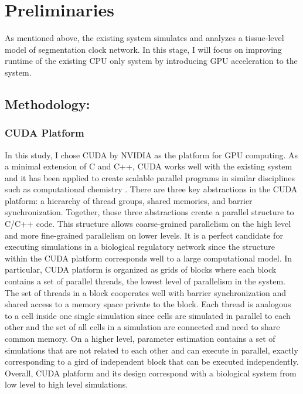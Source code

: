 \documentclass[../thesis.tex]{subfiles}
\begin{document}
\chapter{Preliminaries}
\label{ch:prelim}
As mentioned above, the existing system simulates and analyzes a tissue-level model of segmentation clock network. In this stage, I will focus on improving runtime of the existing CPU only system by introducing GPU acceleration to the system. 
\section{Methodology: }
\subsection{CUDA Platform}
In this study, I chose CUDA by NVIDIA as the platform for GPU computing. As a minimal extension of C and C++, CUDA works well with the existing system and it has been applied to create scalable parallel programs in similar disciplines such as computational chemistry \cite{nickolls2008scalable}. There are three key abstractions in the CUDA platform: a hierarchy of thread groups, shared memories, and barrier synchronization. Together, those three abstractions create a parallel structure to C/C++ code. This structure allows coarse-grained parallelism on the high level and more fine-grained parallelism on lower levels. It is a perfect candidate for executing simulations in a biological regulatory network since the structure within the CUDA platform corresponds well to a large computational model. In particular, CUDA platform is organized as grids of blocks where each block contains a set of parallel threads, the lowest level of parallelism in the system. The set of threads in a block cooperates well with barrier synchronization and shared access to a memory space private to the block.  Each thread is analogous to a cell inside one single simulation since cells are simulated in parallel to each other and the set of all cells in a simulation are connected and need to share common memory. On a higher level, parameter estimation contains a set of simulations that are not related to each other and can execute in parallel, exactly corresponding to a gird of independent block that can be executed independently. Overall, CUDA platform and its design correspond with a biological system from low level to high level simulations.
\end{document}
